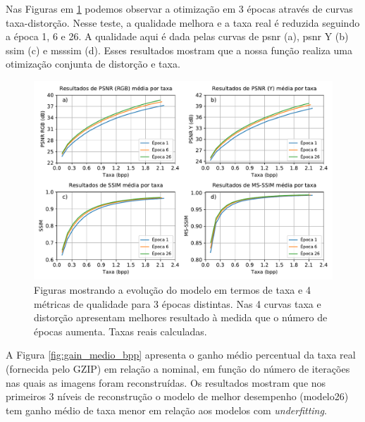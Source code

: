 Nas Figuras em \ref{fig:metricas_3ep} podemos observar a otimização em 3 épocas através de curvas taxa-distorção. Nesse teste, a qualidade melhora e a taxa real é reduzida seguindo a época 1, 6 e 26. A qualidade aqui é dada pelas curvas de \acrshort{psnr} (a), \acrshort{psnr} Y (b)  \acrshort{ssim} (c) e  \acrshort{msssim} (d). Esses resultados mostram que a nossa função realiza uma otimização conjunta de distorção e taxa. 

\begin{figure}
	\centering
	\includegraphics[width=1\textwidth]{figuras/result_3ep.pdf}
	\caption[Curvas de qualidade por taxa em 3 épocas distintas]{Figuras mostrando a evolução do modelo em termos de taxa e 4 métricas de qualidade para 3 épocas distintas. Nas 4 curvas taxa e distorção apresentam melhores resultado à medida que o número de épocas aumenta. Taxas reais calculadas. }  	
	\label{fig:metricas_3ep}
\end{figure}

A Figura \ref{fig:gain_medio_bpp} apresenta o ganho médio percentual da taxa real (fornecida pelo GZIP) em relação a nominal, em  função do número de iterações nas quais as imagens foram reconstruídas. Os resultados mostram que nos primeiros 3 níveis de reconstrução o modelo de melhor desempenho (modelo26) tem ganho médio de taxa menor em relação aos modelos com \textit{underfitting}.  


